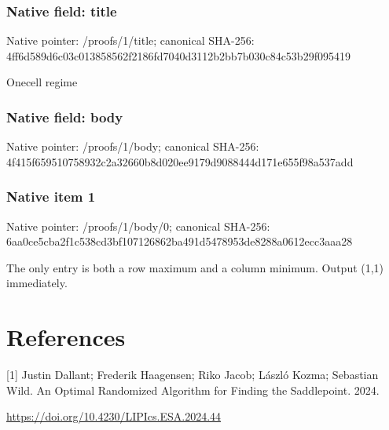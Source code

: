\documentclass[10pt,a4paper]{article}
\begin{document}
\subsubsection{Native field: title}


Native pointer: /proofs/1/title; canonical SHA-256: 4ff6d589d6c03c013858562f\allowbreak{}2186fd7040d3112b2bb7b030\allowbreak{}c84c53b29f095419


Onecell regime


\subsubsection{Native field: body}


Native pointer: /proofs/1/body; canonical SHA-256: 4f415f659510758932c2a326\allowbreak{}60b8d020ee9179d9088444d1\allowbreak{}71e655f98a537add



\subsubsection{Native item 1}


Native pointer: /proofs/1/body/0; canonical SHA-256: 6aa0ce5cba2f1c538cd3bf10\allowbreak{}7126862ba491d5478953de82\allowbreak{}88a0612ecc3aaa28


The only entry is both a row maximum and a column minimum. Output (1,1) immediately.


\section{References}


[1] Justin Dallant; Frederik Haagensen; Riko Jacob; László Kozma; Sebastian Wild. An Optimal Randomized Algorithm for Finding the Saddlepoint. 2024.



\url{https://doi.org/10.4230/LIPIcs.ESA.2024.44}
\end{document}
